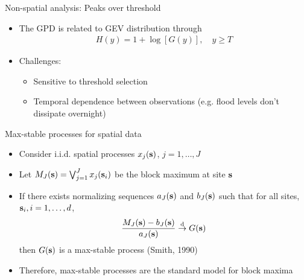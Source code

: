 \documentclass{beamer}
\begin{document}
 \begin{frame}{Non-spatial analysis: Peaks over threshold}
   \begin{itemize} \setlength{\itemsep}{1em}
     \item The GPD is related to GEV distribution through
     \begin{align*}
       H(y) = 1 + \log[G(y)], \quad y \ge T
     \end{align*}
     \item Challenges: \vspace{0.5em}
     \begin{itemize} \setlength{\itemsep}{0.5em}
       \item Sensitive to threshold selection
       \item Temporal dependence between observations (e.g. flood levels don't dissipate overnight)
     \end{itemize}
   \end{itemize}
 \end{frame}

 \begin{frame}{Max-stable processes for spatial data}
   \begin{itemize} \setlength{\itemsep}{1em}
     \item Consider i.i.d. spatial processes $x_j(\mathbf{s})$, $j = 1, \ldots, J$
     \item Let $M_J(\mathbf{s}) = \bigvee_{j=1}^J x_j(\mathbf{s}_i)$ be the block maximum at site $\mathbf{s}$
     \item If there exists normalizing sequences $a_J(\mathbf{s})$ and $b_J(\mathbf{s})$ such that for all sites, $\mathbf{s}_i, i = 1, \ldots, d$,
     \begin{align*}
       \frac{M_J(\mathbf{s}) - b_J(\mathbf{s})}{a_J(\mathbf{s})} \stackrel{\mathrm{d}}{\rightarrow} G(\mathbf{s})
     \end{align*}
     then $G(\mathbf{s})$ is a max-stable process (Smith, 1990)
     \item Therefore, max-stable processes are the standard model for block maxima
   \end{itemize}
 \end{frame}
\end{document}
